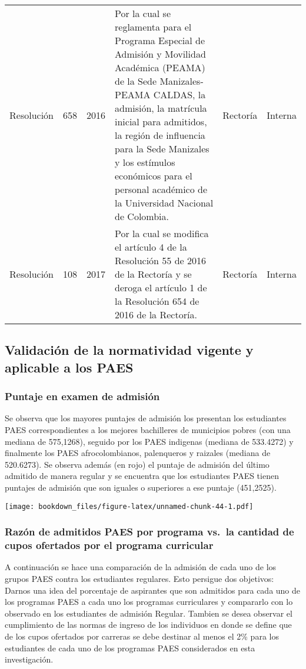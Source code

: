 \documentclass[]{article}
\theoremstyle{definition}
\theoremstyle{definition}
\theoremstyle{definition}
\theoremstyle{remark}
\begin{document}
\begin{table}
\begin{tabular}[t]{lrrlll}
Resolución & 658 & 2016 & Por la cual se reglamenta para el Programa Especial de Admisión y Movilidad Académica (PEAMA) de la Sede Manizales- PEAMA CALDAS, la admisión, la matrícula inicial para admitidos, la región de influencia para la Sede Manizales y los estímulos económicos para el personal académico de la Universidad Nacional de Colombia. & Rectoría & Interna\\
Resolución & 108 & 2017 & Por la cual se modifica el artículo 4 de la Resolución 55 de 2016 de la Rectoría y se deroga el artículo 1 de la Resolución 654 de 2016 de la Rectoría. & Rectoría & Interna\\
\bottomrule
\end{tabular}
\end{table}

\subsection{Validación de la normatividad vigente y aplicable a los
PAES}\label{validacion-de-la-normatividad-vigente-y-aplicable-a-los-paes}

\subsubsection{Puntaje en examen de
admisión}\label{puntaje-en-examen-de-admision-1}

Se observa que los mayores puntajes de admisión los presentan los
estudiantes PAES correspondientes a los mejores bachilleres de
municipios pobres (con una mediana de 575,1268), seguido por los PAES
indigenas (mediana de 533.4272) y finalmente los PAES afrocolombianos,
palenqueros y raizales (mediana de 520.6273). Se observa además (en
rojo) el puntaje de admisión del último admitido de manera regular y se
encuentra que los estudiantes PAES tienen puntajes de admisión que son
iguales o superiores a ese puntaje (451,2525).

\texttt{[image: bookdown\_files/figure-latex/unnamed-chunk-44-1.pdf]}

\subsubsection{Razón de admitidos PAES por programa vs.~la cantidad de
cupos ofertados por el programa
curricular}\label{razon-de-admitidos-paes-por-programa-vs.la-cantidad-de-cupos-ofertados-por-el-programa-curricular}

A continuación se hace una comparación de la admisión de cada uno de los
grupos PAES contra los estudiantes regulares. Esto persigue dos
objetivos: Darnos una idea del porcentaje de aspirantes que son
admitidos para cada uno de los programas PAES a cada uno los programas
curriculares y compararlo con lo observado en los estudiantes de
admisión Regular. Tambien se desea observar el cumplimiento de las
normas de ingreso de los individuos en donde se define que de los cupos
ofertados por carreras se debe destinar al menos el 2\% para los
estudiantes de cada uno de los programas PAES considerados en esta
investigación.
\end{document}
